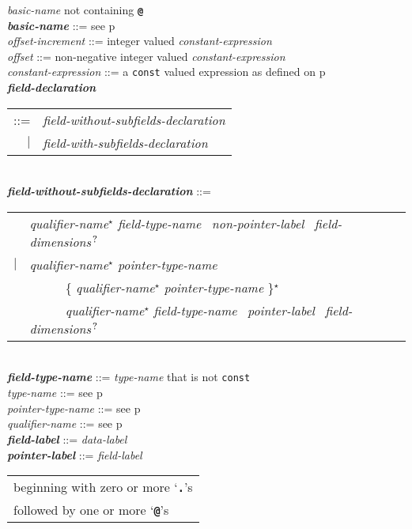 \documentclass[12pt]{article}
\newcommand{\TT}[1]{{\tt \bfseries #1}}
\newcommand{\STAR}{{\Large $^\star$}}
\newcommand{\QMARK}{{$^{\,\mbox{\footnotesize ?}}$}}
\newcommand{\emkey}[1]{{\em \bfseries #1}}
\newcommand{\pagref}[1]{p\pageref{#1}}
\newenvironment{indpar}[1][0.3in]%
	{\begin{list}{}%
		     {\setlength{\itemsep}{0in}%
		      \setlength{\topsep}{0in}%
		      \setlength{\parsep}{1ex}%
		      \setlength{\labelwidth}{#1}%
		      \setlength{\leftmargin}{#1}%
		      \addtolength{\leftmargin}{\labelsep}}%
	 \item}%
	{\end{list}}
\begin{document}
\begin{indpar}
    {\em basic-name} not containing \TT{@} \\
\emkey{basic-name} ::=  see \pagref{BASIC-NAME} \\
{\em offset-increment} ::=
    integer valued {\em constant-expression} \\
{\em offset} ::=
    non-negative integer valued {\em constant-expression} \\
{\em constant-expression} ::= a {\tt const} valued expression as
    defined on \pagref{CONSTANT-EXPRESSION}
\\[2ex]
\emkey{field-declaration}\label{FIELD-DECLARATION}
    \begin{tabular}[t]{@{}rl}
    ::= &  {\em field-without-subfields-declaration} \\
    $|$ &  {\em field-with-subfields-declaration} \\
    \end{tabular}
\\[2ex]
\emkey{field-without-subfields-declaration} ::= \\
\hspace*{0.5in}\begin{tabular}{rl}
        & {\em qualifier-name}\STAR{} {\em field-type-name}~
          {\em non-pointer-label}~ {\em field-dimensions}\QMARK{} \\
    $|$ & {\em qualifier-name}\STAR{} {\em pointer-type-name} \\
        & ~~~~~ \{ {\em qualifier-name}\STAR{} {\em pointer-type-name}
	        \}\STAR{} \\
        & ~~~~~ {\em qualifier-name}\STAR{} {\em field-type-name}~
                {\em pointer-label}~ {\em field-dimensions}\QMARK{}
	\end{tabular}
\\[2ex]
\emkey{field-type-name} ::= {\em type-name} that is not {\tt const} \\
{\em type-name} ::= see \pagref{TYPE-NAME} \\
{\em pointer-type-name} ::= see \pagref{POINTER-TYPE-NAME} \\
{\em qualifier-name} ::= see \pagref{QUALIFIER-NAME}
\\[2ex]
\emkey{field-label}\label{FIELD-LABEL} ::=  {\em data-label} \\
\emkey{pointer-label}\label{POINTER-LABEL} ::= {\em field-label}
    \begin{tabular}[t]{@{}l}
    beginning with zero or more `\TT{.}'s \\
    followed by one or more `\TT{@}'s \\

\end{tabular}
\end{indpar}
\end{document}
